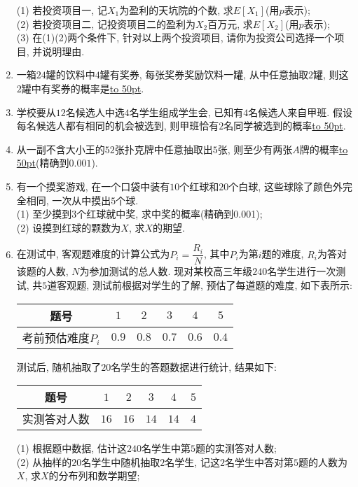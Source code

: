 \documentclass[10pt,a4paper]{article}
\newcommand{\blank}[1]{\underline{\hbox to #1pt{}}}
\begin{document}
\begin{enumerate}[1.]
(1) 若投资项目一, 记$X_1$为盈利的天坑院的个数, 求$E[X_1]$(用$p$表示);\\
(2) 若投资项目二, 记投资项目二的盈利为$X_2$百万元, 求$E[X_2]$(用$p$表示);\\
(3) 在(1)(2)两个条件下, 针对以上两个投资项目, 请你为投资公司选择一个项目, 并说明理由.
\item 一箱$24$罐的饮料中$4$罐有奖券, 每张奖券奖励饮料一罐, 从中任意抽取$2$罐, 则这$2$罐中有奖券的概率是\blank{50}.
\item 学校要从$12$名候选人中选$4$名学生组成学生会, 已知有$4$名候选人来自甲班. 假设每名候选人都有相同的机会被选到, 则甲班恰有$2$名同学被选到的概率\blank{50}.
\item 从一副不含大小王的$52$张扑克牌中任意抽取出$5$张, 则至少有两张$A$牌的概率\blank{50}(精确到$0.001$).
\item 有一个摸奖游戏, 在一个口袋中装有$10$个红球和$20$个白球, 这些球除了颜色外完全相同, 一次从中摸出$5$个球.\\
(1) 至少摸到$3$个红球就中奖, 求中奖的概率(精确到0.001);\\
(2) 设摸到红球的颗数为$X$, 求$X$的期望.
\item 在测试中, 客观题难度的计算公式为$P_i=\dfrac{R_i}N$, 其中$P_i$为第$i$题的难度, $R_i$为答对该题的人数, $N$为参加测试的总人数. 现对某校高三年级$240$名学生进行一次测试, 共$5$道客观题, 测试前根据对学生的了解, 预估了每道题的难度, 如下表所示:
\begin{center}
    \begin{tabular}{|c|c|c|c|c|c|}
        \hline
        题号 & $1$ & $2$ & $3$ & $4$ & $5$ \\ \hline
        考前预估难度$P_i$ & $0.9$ & $0.8$ & $0.7$ & $0.6$ & $0.4$ \\ \hline       
    \end{tabular}
\end{center}
测试后, 随机抽取了$20$名学生的答题数据进行统计, 结果如下:
\begin{center}
    \begin{tabular}{|c|c|c|c|c|c|}
        \hline
        题号 & $1$ & $2$ & $3$ & $4$ & $5$ \\ \hline
        实测答对人数 & $16$ & $16$ & $14$ & $14$ & $4$ \\ \hline       
    \end{tabular}
\end{center}
(1) 根据题中数据, 估计这$240$名学生中第$5$题的实测答对人数;\\
(2) 从抽样的$20$名学生中随机抽取$2$名学生, 记这$2$名学生中答对第$5$题的人数为$X$, 求$X$的分布列和数学期望;\\

\end{enumerate}
\end{document}
